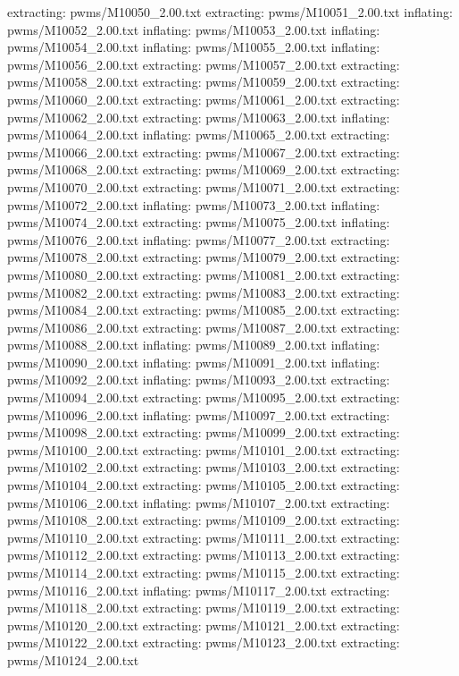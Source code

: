 \documentclass[letterpaper,10pt,english]{sphinxmanual}
\begin{document}
{\begin{sphinxVerbatim}[commandchars=\\\{\}]
 extracting: pwms/M10050\_2.00.txt
 extracting: pwms/M10051\_2.00.txt
  inflating: pwms/M10052\_2.00.txt
  inflating: pwms/M10053\_2.00.txt
  inflating: pwms/M10054\_2.00.txt
  inflating: pwms/M10055\_2.00.txt
  inflating: pwms/M10056\_2.00.txt
 extracting: pwms/M10057\_2.00.txt
 extracting: pwms/M10058\_2.00.txt
 extracting: pwms/M10059\_2.00.txt
 extracting: pwms/M10060\_2.00.txt
 extracting: pwms/M10061\_2.00.txt
 extracting: pwms/M10062\_2.00.txt
 extracting: pwms/M10063\_2.00.txt
  inflating: pwms/M10064\_2.00.txt
  inflating: pwms/M10065\_2.00.txt
 extracting: pwms/M10066\_2.00.txt
 extracting: pwms/M10067\_2.00.txt
 extracting: pwms/M10068\_2.00.txt
 extracting: pwms/M10069\_2.00.txt
 extracting: pwms/M10070\_2.00.txt
 extracting: pwms/M10071\_2.00.txt
 extracting: pwms/M10072\_2.00.txt
  inflating: pwms/M10073\_2.00.txt
  inflating: pwms/M10074\_2.00.txt
 extracting: pwms/M10075\_2.00.txt
  inflating: pwms/M10076\_2.00.txt
  inflating: pwms/M10077\_2.00.txt
 extracting: pwms/M10078\_2.00.txt
 extracting: pwms/M10079\_2.00.txt
 extracting: pwms/M10080\_2.00.txt
 extracting: pwms/M10081\_2.00.txt
 extracting: pwms/M10082\_2.00.txt
 extracting: pwms/M10083\_2.00.txt
 extracting: pwms/M10084\_2.00.txt
 extracting: pwms/M10085\_2.00.txt
 extracting: pwms/M10086\_2.00.txt
 extracting: pwms/M10087\_2.00.txt
 extracting: pwms/M10088\_2.00.txt
  inflating: pwms/M10089\_2.00.txt
  inflating: pwms/M10090\_2.00.txt
  inflating: pwms/M10091\_2.00.txt
  inflating: pwms/M10092\_2.00.txt
  inflating: pwms/M10093\_2.00.txt
 extracting: pwms/M10094\_2.00.txt
 extracting: pwms/M10095\_2.00.txt
 extracting: pwms/M10096\_2.00.txt
  inflating: pwms/M10097\_2.00.txt
 extracting: pwms/M10098\_2.00.txt
 extracting: pwms/M10099\_2.00.txt
 extracting: pwms/M10100\_2.00.txt
 extracting: pwms/M10101\_2.00.txt
 extracting: pwms/M10102\_2.00.txt
 extracting: pwms/M10103\_2.00.txt
 extracting: pwms/M10104\_2.00.txt
 extracting: pwms/M10105\_2.00.txt
 extracting: pwms/M10106\_2.00.txt
  inflating: pwms/M10107\_2.00.txt
 extracting: pwms/M10108\_2.00.txt
 extracting: pwms/M10109\_2.00.txt
 extracting: pwms/M10110\_2.00.txt
 extracting: pwms/M10111\_2.00.txt
 extracting: pwms/M10112\_2.00.txt
 extracting: pwms/M10113\_2.00.txt
 extracting: pwms/M10114\_2.00.txt
 extracting: pwms/M10115\_2.00.txt
 extracting: pwms/M10116\_2.00.txt
  inflating: pwms/M10117\_2.00.txt
 extracting: pwms/M10118\_2.00.txt
 extracting: pwms/M10119\_2.00.txt
 extracting: pwms/M10120\_2.00.txt
 extracting: pwms/M10121\_2.00.txt
 extracting: pwms/M10122\_2.00.txt
 extracting: pwms/M10123\_2.00.txt
 extracting: pwms/M10124\_2.00.txt

\end{sphinxVerbatim}}
\end{document}
